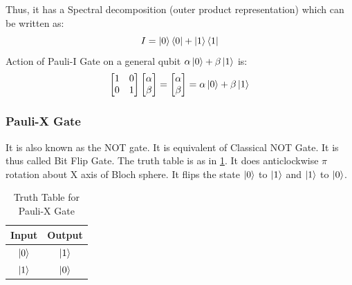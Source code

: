 Thus, it has a Spectral decomposition (outer product representation) which can be written as:
\[
    I=\ket{0}\bra{0}+\ket{1}\bra{1}
\]
Action of Pauli-I Gate on a general qubit $\alpha\ket{0}+\beta\ket{1}$ is:
\[
    \begin{bmatrix}
        1 & 0 \\
        0 & 1
    \end{bmatrix}\begin{bmatrix}
        \alpha \\
        \beta
    \end{bmatrix}=\begin{bmatrix}
        \alpha \\
        \beta
    \end{bmatrix}= \alpha\ket{0}+\beta\ket{1}
\]

\subsubsection{Pauli-X Gate}
It is also known as the NOT gate. It is equivalent of Classical NOT Gate.
It is thus called Bit Flip Gate. The truth table is as in \ref{tab:pauli-x}. It does anticlockwise $\pi$ rotation about X 
axis of Bloch sphere. It flips the state $\ket{0}$ to $\ket{1}$ and $\ket{1}$ to $\ket{0}$.
\begin{table}[ht]
    \centering
    \begin{tabular}{|c|c|}
        \hline
        Input & Output\\
        \hline
        $\ket{0}$ & $\ket{1}$\\
        $\ket{1}$ & $\ket{0}$\\
        \hline
    \end{tabular}
    \caption{Truth Table for Pauli-X Gate}
    \label{tab:pauli-x}
\end{table}


